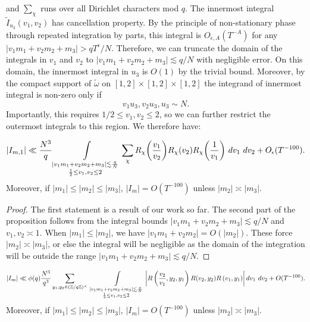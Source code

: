 and $\sum_\chi$ runs over all Dirichlet characters mod $q$.
The innermost integral $\tilde{I}_{u_3}(v_1,v_2)$ has cancellation property. By the principle of non-stationary phase through repeated integration by parts, this integral is $O_{\epsilon, A}(T^{-A})$ for any $|v_1m_1+v_2m_2+m_3|>qT^\epsilon/N$. Therefore, we can truncate the domain of the integrals in $v_1$ and $v_2$ to  $|v_1m_1+v_2m_2+m_3|\lesssim q/N$ with negligible error. On this domain, the innermost integral in $u_3$ is $O(1)$ by the trivial bound. Moreover, by the compact support of $\tilde{\omega}$ on $[1,2]\times [1,2]\times [1,2]$  the integrand of innermost integral is non-zero only if \[
v_1u_3,v_2u_3,u_3\sim N.
\]
Importantly, this requires $1/2 \leq v_1,v_2 \leq 2$, so we can further restrict the outermost integrals to this region. 
We therefore have: 
\begin{proposition}
    \[
    |I_{m,1}|\ll \frac{N^3}{q}\int\displaylimits_{\substack{
        |v_1m_1+v_2m_2+m_3|\lesssim \frac{q}{N}\\
        \frac{1}{2}\leq v_1,v_2\leq 2
}} \sum_{\chi} R_{\chi}{\left(\frac{v_1}{v_2}\right)}R_{\chi} {\left(v_2\right)}R_{\chi}{\left(\frac{1}{v_1}\right)} \ dv_1\ dv_2+O_{\epsilon}(T^{-100}).
    \]
    Moreover, if $|m_1|\leq|m_2|\leq |m_3|$, $|I_m|=O(T^{-100})$ unless $|m_2|\asymp|m_3|$.
\end{proposition}
\begin{proof}
    The first statement is a result of our work so far. The second part of the proposition follows from the integral bounds $|v_1m_1+v_2m_2+m_3|\lesssim q/N$
    and $v_1,v_2\asymp 1$. When $|m_1|\leq |m_2|$, we have $|v_1m_1+v_2m_2|=O(|m_2|)$. These force $|m_2| \asymp|m_3|$, or else the integral will be negligible as the domain of the integration will be outside the range $|v_1m_1+v_2m_2+m_3|\lesssim q/N$.
\end{proof}
    \iffalse
    \begin{proposition}
        \label{doubleintegrals3}
        \[
        |I_m|\ll \phi(q) \frac{N^3}{q^3}  
        \sum_{y_1,y_2\in (\mathbb{Z}/q\mathbb{Z})^\times}\ \int\displaylimits_{\substack{
            |v_1m_1+v_2m_2+m_3|\lesssim \frac{q}{N}\\
            \frac{1}{2}\leq v_1,v_2\leq 2
        }} \left| R\left(\frac{v_2}{v_1},y_2,y_1\right)
        R(v_2,y_2)R\left(v_1,y_1\right)\right| dv_1 \ dv_2  + O(T^{-100}).\\
        \]
        Moreover, if $|m_1|\leq|m_2|\leq |m_3|$, $|I_m|=O(T^{-100})$ unless $|m_2|\asymp|m_3|$.
    \end{proposition}
